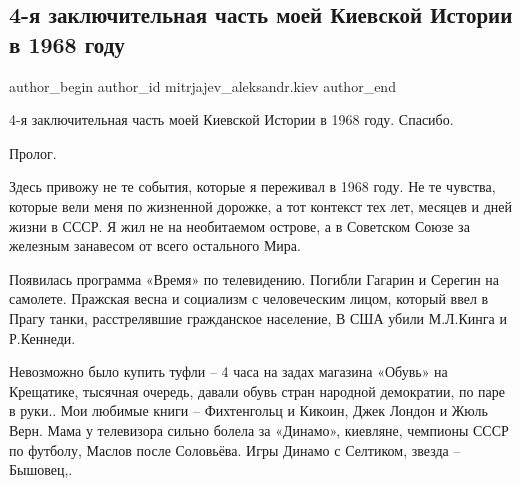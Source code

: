  
 
 
 
 
 
\subsection{4-я заключительная  часть моей Киевской Истории в 1968 году}
\label{sec:18_12_2021.fb.mitrjajev_aleksandr.kiev.1.chast_chetyre_kiev_istoria_1968}
 
\ifcmt
 author_begin
   author_id mitrjajev_aleksandr.kiev
 author_end
\fi

4-я заключительная  часть моей Киевской Истории в 1968 году. Спасибо.

Пролог.

Здесь привожу не те события, которые я переживал в 1968 году. Не те чувства,
которые вели меня по жизненной дорожке, а тот контекст тех лет, месяцев и дней
жизни в СССР. Я жил не на необитаемом острове, а в Советском Союзе за железным
занавесом от всего остального Мира.


Появилась программа «Время» по телевидению.  Погибли  Гагарин и Серегин на
самолете.  Пражская весна и социализм с человеческим лицом, который ввел в
Прагу танки, расстрелявшие гражданское население,  В США убили М.Л.Кинга и
Р.Кеннеди. 


Невозможно было купить туфли – 4 часа на задах магазина «Обувь» на Крещатике,
тысячная очередь, давали обувь стран народной демократии, по паре в руки.. Мои
любимые книги – Фихтенгольц и  Кикоин, Джек Лондон и Жюль Верн. Мама у
телевизора сильно болела за «Динамо», киевляне, чемпионы СССР по футболу,
Маслов после Соловьёва.  Игры Динамо с Селтиком, звезда – Бышовец,. 



